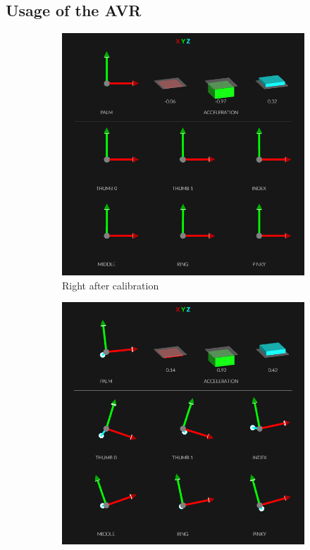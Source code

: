 \documentclass[hyperref, bachelorofscience]{cgvpub}
\begin{document}
\subsection{Usage of the \Gls{AVR}}
\begin{figure}
	\centering
	\begin{subfigure}{.3\linewidth}
		\includegraphics[width=\linewidth]{../pics/glove_cal1}
		\caption{Right after calibration}
		\label{fig:glove_cal:trivial}
	\end{subfigure}
	\hfill
	\begin{subfigure}{.3\linewidth}
		\includegraphics[width=\linewidth]{../pics/glove_cal2}

\end{subfigure}
\end{figure}
\end{document}
